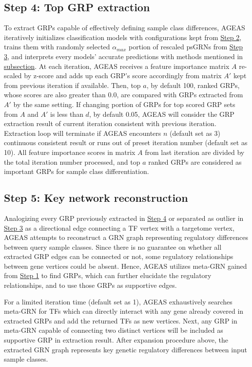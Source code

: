\documentclass[fleqn,10pt]{wlscirep}
\begin{document}
  \subsection*{Step 4: Top GRP extraction}
    \label{step4}
    To extract GRPs capable of effectively defining sample class differences, AGEAS iteratively initializes classification models with configurations kept from \hyperref[step2]{Step 2}, trains them with randomly selected $\alpha_{max}$ portion of rescaled psGRNs from \hyperref[step3]{Step 3}, and interprets every models' accurate predictions with methods mentioned in \hyperref[features_importances]{subsection}.
    At each iteration, AGEAS receives a feature importance matrix $A$ re-scaled by z-score and adds up each GRP's score accordingly from matrix $A'$ kept from previous iteration if available.
    Then, top $a$, by default 100, ranked GRPs, whose scores are also greater than $0.0$, are compared with GRPs extracted from $A'$ by the same setting.
    If changing portion of GRPs for top scored GRP sets from $A$ and $A'$ is less than $d$, by default 0.05, AGEAS will consider the GRP extraction result of current iteration consistent with previous iteration.
    Extraction loop will terminate if AGEAS encounters $n$ (default set as 3) continuous consistent result or runs out of preset iteration number (default set as 10).
    All feature importance scores in matrix $A$ from last iteration are divided by the total iteration number processed, and top $a$ ranked GRPs are considered as important GRPs for sample class differentiation.

  \subsection*{Step 5: Key network reconstruction}
    \label{step5}
    Analogizing every GRP previously extracted in \hyperref[step4]{Step 4} or separated as outlier in \hyperref[step3]{Step 3} as a directional edge connecting a TF vertex with a targetome vertex, AGEAS attempts to reconstruct a GRN graph representing regulatory differences between query sample classes.
    Since there is no guarantee on whether all extracted GRP edges can be connected or not, some regulatory relationships between gene vertices could be absent.
    Hence, AGEAS utilizes meta-GRN gained from \hyperref[step1]{Step 1} to find GRPs, which can further elucidate the regulatory relationships, and to use those GRPs as supportive edges.

    For a limited iteration time (default set as  1), AGEAS exhaustively searches meta-GRN for TFs which can directly interact with any gene already covered in extracted GRPs and add the returned TFs as new vertices.
    Next, any GRP in meta-GRN capable of connecting two distinct vertices will be included as supportive GRP in extraction result.
    After expansion procedure above, the extracted GRN graph represents key genetic regulatory differences between input sample classes.
\end{document}
